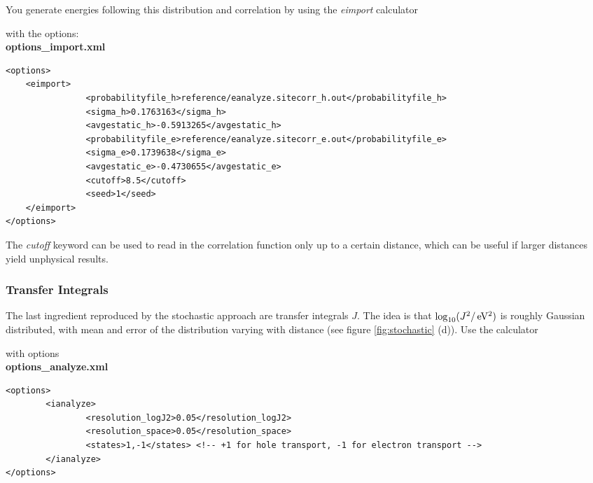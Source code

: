 You generate energies following this distribution and correlation by using the \emph{eimport} calculator


with the options:\\

\textbf{options\_import.xml}

\lstset{language=XML2}
\begin{lstlisting}
<options>
	<eimport>
                <probabilityfile_h>reference/eanalyze.sitecorr_h.out</probabilityfile_h>
                <sigma_h>0.1763163</sigma_h>
                <avgestatic_h>-0.5913265</avgestatic_h>
                <probabilityfile_e>reference/eanalyze.sitecorr_e.out</probabilityfile_e>
                <sigma_e>0.1739638</sigma_e>
                <avgestatic_e>-0.4730655</avgestatic_e>
                <cutoff>8.5</cutoff>
                <seed>1</seed>
	</eimport>
</options>
\end{lstlisting}

The \emph{cutoff} keyword can be used to read in the correlation function only up to a certain distance, which can be useful if larger distances yield unphysical results.

\subsubsection{Transfer Integrals}

The last ingredient reproduced by the stochastic approach are transfer integrals $J$. The idea is that $\log_{10}(\unit[J^2/]{eV^2})$ is roughly Gaussian distributed, with mean and error of the distribution varying with distance (see figure \ref{fig:stochastic} (d)). Use the calculator\\

with options\\

\textbf{options\_analyze.xml}

\lstset{language=XML2}
\begin{lstlisting}
<options>
        <ianalyze>
                <resolution_logJ2>0.05</resolution_logJ2>
                <resolution_space>0.05</resolution_space>
                <states>1,-1</states> <!-- +1 for hole transport, -1 for electron transport -->
        </ianalyze>
</options>
\end{lstlisting}

